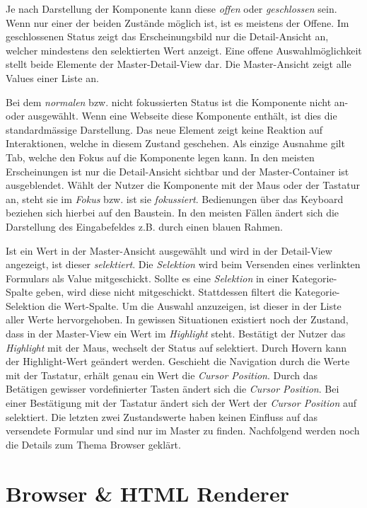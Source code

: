 Je nach Darstellung der Komponente kann diese \emph{offen} oder \emph{geschlossen} sein.
Wenn nur einer der beiden Zustände möglich ist, ist es meistens der Offene.
Im geschlossenen Status zeigt das Erscheinungsbild nur die Detail-Ansicht an, welcher mindestens den selektierten Wert anzeigt.
Eine offene Auswahlmöglichkeit stellt beide Elemente der Master-Detail-View dar.
Die Master-Ansicht zeigt alle Values einer Liste an.

Bei dem \emph{normalen} bzw. nicht fokussierten Status ist die Komponente nicht an- oder ausgewählt.
Wenn eine Webseite diese Komponente enthält, ist dies die standardmässige Darstellung.
Das neue Element zeigt keine Reaktion auf Interaktionen, welche in diesem Zustand geschehen. 
Als einzige Ausnahme gilt Tab, welche den Fokus auf die Komponente legen kann. 
In den meisten Erscheinungen ist nur die Detail-Ansicht sichtbar und der Master-Container ist ausgeblendet.
Wählt der Nutzer die Komponente mit der Maus oder der Tastatur an, steht sie im \emph{Fokus} bzw. ist sie \emph{fokussiert}.
Bedienungen über das Keyboard beziehen sich hierbei auf den Baustein.
In den meisten Fällen ändert sich die Darstellung des Eingabefeldes z.B. durch einen blauen Rahmen.

Ist ein Wert in der Master-Ansicht ausgewählt und wird in der Detail-View angezeigt, ist dieser \emph{selektiert}.
Die \emph{Selektion} wird beim Versenden eines verlinkten Formulars als Value mitgeschickt.
Sollte es eine \emph{Selektion} in einer Kategorie-Spalte geben, wird diese nicht mitgeschickt.
Stattdessen filtert die Kategorie-Selektion die Wert-Spalte.
Um die Auswahl anzuzeigen, ist dieser in der Liste aller Werte hervorgehoben.
In gewissen Situationen existiert noch der Zustand, dass in der Master-View ein Wert im \emph{Highlight} steht. 
Bestätigt der Nutzer das \emph{Highlight} mit der Maus, wechselt der Status auf selektiert.
Durch Hovern kann der Highlight-Wert geändert werden. 
Geschieht die Navigation durch die Werte mit der Tastatur, erhält genau ein Wert die \emph{Cursor Position}. 
Durch das Betätigen gewisser vordefinierter Tasten ändert sich die \emph{Cursor Position}.
Bei einer Bestätigung mit der Tastatur ändert sich der Wert der \emph{Cursor Position} auf selektiert.
Die letzten zwei Zustandswerte haben keinen Einfluss auf das versendete Formular und sind nur im Master zu finden.
Nachfolgend werden noch die Details zum Thema Browser geklärt.


\section{Browser \& HTML Renderer}
\label{sec:browserRenderer}

